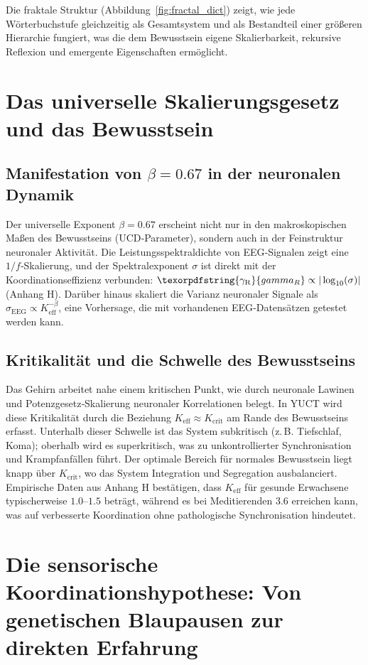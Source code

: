 \documentclass[12pt,a4paper]{article}
\DeclareRobustCommand{\gaR}{\texorpdfstring{\ensuremath{\gamma_{\mathrm{R}}}}{gamma_R}}
\newcommand{\eff}{\mathrm{eff}}
\newcommand{\Ke}{K_{\eff}}
\newcommand{\Kcrit}{K_{\mathrm{crit}}}
\begin{document}
	Die fraktale Struktur (Abbildung~\ref{fig:fractal_dict}) zeigt, wie jede Wörterbuchstufe gleichzeitig als Gesamtsystem und als Bestandteil einer größeren Hierarchie fungiert, was die dem Bewusstsein eigene Skalierbarkeit, rekursive Reflexion und emergente Eigenschaften ermöglicht.
	
	\section{Das universelle Skalierungsgesetz und das Bewusstsein}
	
	\subsection{Manifestation von $\beta = 0.67$ in der neuronalen Dynamik}
	
	Der universelle Exponent $\beta = 0.67$ erscheint nicht nur in den makroskopischen Maßen des Bewusstseins (UCD‑Parameter), sondern auch in der Feinstruktur neuronaler Aktivität. Die Leistungsspektraldichte von EEG‑Signalen zeigt eine $1/f$‑Skalierung, und der Spektralexponent $\sigma$ ist direkt mit der Koordinationseffizienz verbunden: $\gaR \propto |\log_{10}(\sigma)|$ (Anhang H). Darüber hinaus skaliert die Varianz neuronaler Signale als $\sigma_{\text{EEG}} \propto \Ke^{-\beta}$, eine Vorhersage, die mit vorhandenen EEG‑Datensätzen getestet werden kann.
	
	\subsection{Kritikalität und die Schwelle des Bewusstseins}
	
	Das Gehirn arbeitet nahe einem kritischen Punkt, wie durch neuronale Lawinen und Potenzgesetz‑Skalierung neuronaler Korrelationen belegt. In YUCT wird diese Kritikalität durch die Beziehung $\Ke \approx \Kcrit$ am Rande des Bewusstseins erfasst. Unterhalb dieser Schwelle ist das System subkritisch (z. B. Tiefschlaf, Koma); oberhalb wird es superkritisch, was zu unkontrollierter Synchronisation und Krampfanfällen führt. Der optimale Bereich für normales Bewusstsein liegt knapp über $\Kcrit$, wo das System Integration und Segregation ausbalanciert. Empirische Daten aus Anhang H bestätigen, dass $\Ke$ für gesunde Erwachsene typischerweise $1.0$–$1.5$ beträgt, während es bei Meditierenden $3.6$ erreichen kann, was auf verbesserte Koordination ohne pathologische Synchronisation hindeutet.
	
	\section{Die sensorische Koordinationshypothese: Von genetischen Blaupausen zur direkten Erfahrung}
	
\end{document}
